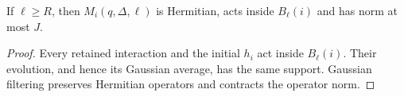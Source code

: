 \begin{lemma}
    \label{thm:hastings05_metric_filter_properties}
    \leanok
    If $\ell\ge R$, then $M_i(q,\Delta,\ell)$ is Hermitian, acts inside
    $B_\ell(i)$ and has norm at most $J$.
\end{lemma}
\begin{proof}\leanok
    Every retained interaction and the initial $h_i$ act inside
    $B_\ell(i)$. Their evolution, and hence its Gaussian average, has the
    same support. Gaussian filtering preserves Hermitian operators and
    contracts the operator norm.
\end{proof}

